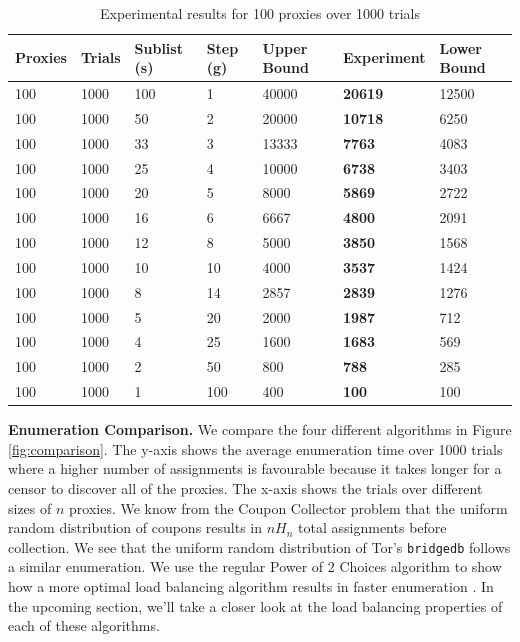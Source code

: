 \begin{table}[t]
\begin{tabular}{l|l|l|l|l|l|l}
             Proxies & Trials & Sublist (s) & Step (g) & Upper Bound & Experiment & Lower Bound  \\
\hline
\hline
100 & 1000 & 100 & 1 & 40000 & \textbf{20619} & 12500 \\\hline
100 & 1000 & 50 & 2 & 20000 & \textbf{10718}	& 6250 \\\hline
100 & 1000 & 33 & 3 & 13333	& \textbf{7763} & 4083 \\\hline
100 & 1000 & 25 & 4 & 10000 & \textbf{6738} & 3403 \\\hline
100 & 1000 & 20 & 5 & 8000 & \textbf{5869} & 2722\\\hline
100 & 1000 & 16 & 6 & 6667 & \textbf{4800} & 2091 \\\hline
100 & 1000 & 12 & 8 & 5000 & \textbf{3850} & 1568\\\hline
100 & 1000 & 10 & 10 & 4000	& \textbf{3537} & 1424\\\hline
100 & 1000 & 8 & 14 & 2857 & \textbf{2839} & 1276\\\hline
100 & 1000 & 5 & 20 & 2000 & \textbf{1987} & 712\\\hline
100 & 1000 & 4 & 25 & 1600 & \textbf{1683} & 569\\\hline
100 & 1000 & 2 & 50 & 800 & \textbf{788} & 285\\\hline
100 & 1000 & 1 & 100 & 400 & \textbf{100} & 100\\\hline

\end{tabular}
\caption{Experimental results for 100 proxies over 1000 trials\label{tab:enumn100} }
\end{table}

\textbf{Enumeration Comparison.} We compare the four different algorithms in Figure \ref{fig:comparison}. The y-axis shows the average enumeration time over 1000 trials where a higher number of assignments is favourable because it takes longer for a censor to discover all of the proxies. The x-axis shows the trials over different sizes of $n$ proxies. We know from the Coupon Collector problem that the uniform random distribution of coupons results in $nH_n$ total assignments before collection. We see that the uniform random distribution of Tor's \texttt{bridgedb} follows a similar enumeration. We use the regular Power of 2 Choices algorithm to show how a more optimal load balancing algorithm results in faster enumeration \cite{xu2011generalized}. In the upcoming section, we'll take a closer look at the load balancing properties of each of these algorithms.

